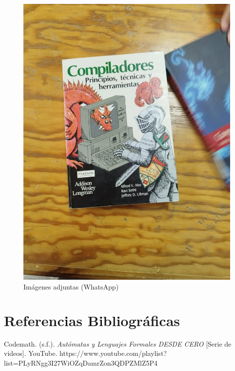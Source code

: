 \documentclass{article}
\begin{document}
\begin{figure}[!ht]
\begin{minipage}{0.48\textwidth}
    \includegraphics[width=0.9\linewidth]{imagenes/Imagen de WhatsApp 2025-10-17 a las 07.08.08_f83b5967.jpg}
  \end{minipage}
  \caption*{Imágenes adjuntas (WhatsApp)}
\end{figure}

\section{Referencias Bibliográficas}
  \begin{thebibliography}{100}
Codemath. (s.f.). \textit{Autómatas y Lenguajes Formales DESDE CERO} [Serie de videos]. YouTube. https://www.youtube.com/playlist?list=PLyRNgg3I27WiOZqDamrZon3QDPZMlZ5P4
  \end{thebibliography}
\end{document}
